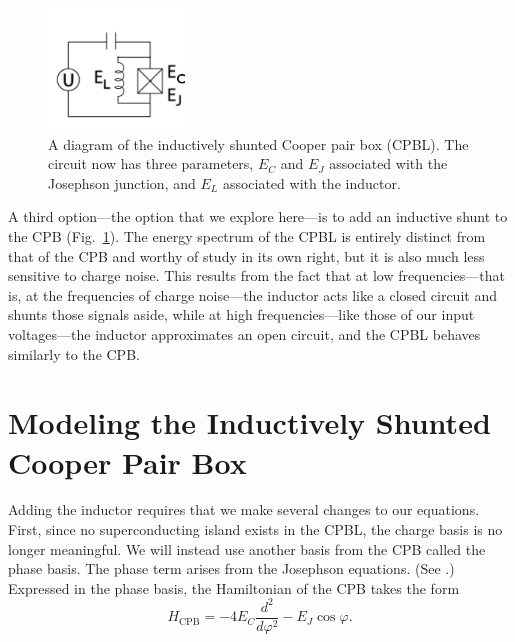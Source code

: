 \documentclass[twocolumn]{revtex4}
\newcommand{\figwidth}{0.33\textwidth}
\begin{document}
\begin{figure}
  \includegraphics[width=\figwidth]{CPBL-circuit.png}
  \caption{ A diagram of the inductively shunted Cooper pair box
    (CPBL). The circuit now has three parameters, $E_C$ and $E_J$
    associated with the Josephson junction, and $E_L$ associated with
    the inductor.}
  \label{CPBL-circuit}
\end{figure}

A third option---the option that we explore here---is to add an
inductive shunt to the CPB (Fig.~\ref{CPBL-circuit}). The energy
spectrum of the CPBL is entirely distinct from that of the CPB and
worthy of study in its own right, but it is also much less sensitive
to charge noise. This results from the fact that at low
frequencies---that is, at the frequencies of charge noise---the
inductor acts like a closed circuit and shunts those signals
aside, while at high frequencies---like those of our input
voltages---the inductor approximates an open circuit, and the CPBL
behaves similarly to the CPB.

\section{Modeling the Inductively Shunted Cooper Pair Box}

Adding the inductor requires that we make several changes to our
equations. First, since no superconducting island exists in the CPBL,
the charge basis is no longer meaningful. We will instead use another
basis from the CPB called the phase basis. The phase term arises from
the Josephson equations. (See \cite{Feynman}.) Expressed in the phase
basis, the Hamiltonian of the CPB takes the form
\begin{equation}
  H_{\text{CPB}} = -4E_C\frac{d^2}{d\varphi^2}-E_J\cos{\varphi}.
\end{equation}
\end{document}
